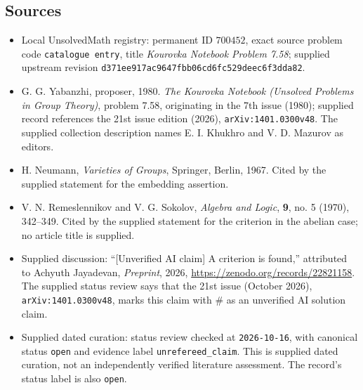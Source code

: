 \documentclass[11pt]{article}
\begin{document}
\subsection{Sources}
\begin{itemize}
\item Local UnsolvedMath registry: permanent ID \(700452\), exact source problem code \texttt{catalogue entry}, title \emph{Kourovka Notebook Problem 7.58}; supplied upstream revision \texttt{d371ee917ac9647fbb06cd6fc529deec6f3dda82}.
\item G. G. Yabanzhi, proposer, 1980. \emph{The Kourovka Notebook (Unsolved Problems in Group Theory)}, problem 7.58, originating in the 7th issue (1980); supplied record references the 21st issue edition (2026), \texttt{arXiv:1401.0300v48}. The supplied collection description names E. I. Khukhro and V. D. Mazurov as editors.
\item H. Neumann, \emph{Varieties of Groups}, Springer, Berlin, 1967. Cited by the supplied statement for the embedding assertion.
\item V. N. Remeslennikov and V. G. Sokolov, \emph{Algebra and Logic}, \textbf{9}, no. 5 (1970), 342--349. Cited by the supplied statement for the criterion in the abelian case; no article title is supplied.
\item Supplied discussion: ``[Unverified AI claim] A criterion is found,'' attributed to Achyuth Jayadevan, \emph{Preprint}, 2026, \url{https://zenodo.org/records/22821158}. The supplied status review says that the 21st issue (October 2026), \texttt{arXiv:1401.0300v48}, marks this claim with \(\#\) as an unverified AI solution claim.
\item Supplied dated curation: status review checked at \texttt{2026-10-16}, with canonical status \texttt{open} and evidence label \texttt{unrefereed\_claim}. This is supplied dated curation, not an independently verified literature assessment. The record's status label is also \texttt{open}.
\end{itemize}
\end{document}
